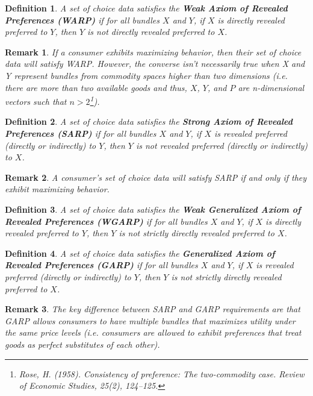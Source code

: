 \documentclass{article} %
\newtheorem{definition}{Definition} %
\newtheorem{remark}{Remark}
\begin{document}
\begin{definition}
A set of choice data satisfies the \textbf{Weak Axiom of Revealed Preferences (WARP)} if for all bundles $X$ and $Y$, if $X$ is directly revealed preferred to $Y$, then $Y$ is not directly revealed preferred to $X$.
\end{definition}

\begin{remark}
If a consumer exhibits maximizing behavior, then their set of choice data will satisfy WARP. However, the converse isn't necessarily true when X and Y represent bundles from commodity spaces higher than two dimensions (i.e. there are more than two available goods and thus, $X$, $Y$, and $P$ are n-dimensional vectors such that $n> 2$\footnote{Rose, H. (1958). Consistency of preference: The two-commodity case. Review of Economic Studies, 25(2), 124–125.}). 
\end{remark}

\begin{definition}
A set of choice data satisfies the \textbf{Strong Axiom of Revealed Preferences (SARP)} if for all bundles $X$ and $Y$, if $X$ is revealed preferred (directly or indirectly) to $Y$, then $Y$ is not revealed preferred (directly or indirectly) to $X$.
\end{definition}

\begin{remark}
A consumer's set of choice data will satisfy SARP if and only if they exhibit maximizing behavior. 
\end{remark}

\begin{definition}
A set of choice data satisfies the \textbf{Weak Generalized Axiom of Revealed Preferences (WGARP)} if for all bundles $X$ and $Y$, if $X$ is directly revealed preferred to $Y$, then $Y$ is not strictly directly revealed preferred to $X$.
\end{definition}

\begin{definition}
A set of choice data satisfies the \textbf{Generalized Axiom of Revealed Preferences (GARP)} if for all bundles $X$ and $Y$, if $X$ is revealed preferred (directly or indirectly) to $Y$, then $Y$ is not strictly directly revealed preferred to $X$.
\end{definition}

\begin{remark}
The key difference between SARP and GARP requirements are that GARP allows consumers to have multiple bundles that maximizes utility under the same price levels (i.e. consumers are allowed to exhibit preferences that treat goods as perfect substitutes of each other).
\end{remark}
\end{document}

